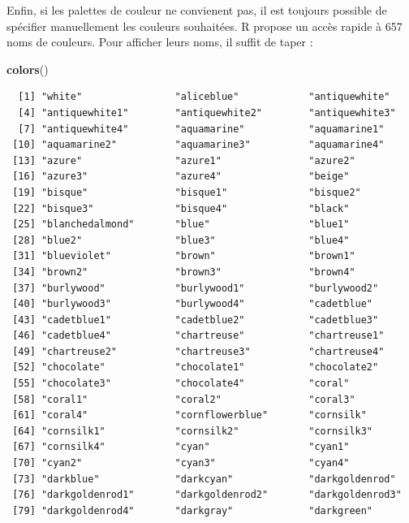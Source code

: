 \documentclass[a4paperpaper,]{article}
\newenvironment{Shaded}{\begin{snugshade}}{\end{snugshade}}
\newcommand{\KeywordTok}[1]{\textcolor[rgb]{0.12,0.11,0.11}{\textbf{#1}}}
\newcommand{\NormalTok}[1]{\textcolor[rgb]{0.12,0.11,0.11}{#1}}
\theoremstyle{definition}
\theoremstyle{definition}
\theoremstyle{definition}
\theoremstyle{remark}
\begin{document}
Enfin, si les palettes de couleur ne convienent pas, il est toujours
possible de spécifier manuellement les couleurs souhaitées. R propose un
accès rapide à 657 noms de couleurs. Pour afficher leurs noms, il suffit
de taper :

\begin{Shaded}
\begin{Highlighting}[]
\KeywordTok{colors}\NormalTok{()}
\end{Highlighting}
\end{Shaded}

\begin{verbatim}
  [1] "white"                "aliceblue"            "antiquewhite"        
  [4] "antiquewhite1"        "antiquewhite2"        "antiquewhite3"       
  [7] "antiquewhite4"        "aquamarine"           "aquamarine1"         
 [10] "aquamarine2"          "aquamarine3"          "aquamarine4"         
 [13] "azure"                "azure1"               "azure2"              
 [16] "azure3"               "azure4"               "beige"               
 [19] "bisque"               "bisque1"              "bisque2"             
 [22] "bisque3"              "bisque4"              "black"               
 [25] "blanchedalmond"       "blue"                 "blue1"               
 [28] "blue2"                "blue3"                "blue4"               
 [31] "blueviolet"           "brown"                "brown1"              
 [34] "brown2"               "brown3"               "brown4"              
 [37] "burlywood"            "burlywood1"           "burlywood2"          
 [40] "burlywood3"           "burlywood4"           "cadetblue"           
 [43] "cadetblue1"           "cadetblue2"           "cadetblue3"          
 [46] "cadetblue4"           "chartreuse"           "chartreuse1"         
 [49] "chartreuse2"          "chartreuse3"          "chartreuse4"         
 [52] "chocolate"            "chocolate1"           "chocolate2"          
 [55] "chocolate3"           "chocolate4"           "coral"               
 [58] "coral1"               "coral2"               "coral3"              
 [61] "coral4"               "cornflowerblue"       "cornsilk"            
 [64] "cornsilk1"            "cornsilk2"            "cornsilk3"           
 [67] "cornsilk4"            "cyan"                 "cyan1"               
 [70] "cyan2"                "cyan3"                "cyan4"               
 [73] "darkblue"             "darkcyan"             "darkgoldenrod"       
 [76] "darkgoldenrod1"       "darkgoldenrod2"       "darkgoldenrod3"      
 [79] "darkgoldenrod4"       "darkgray"             "darkgreen"           

\end{verbatim}
\end{document}
